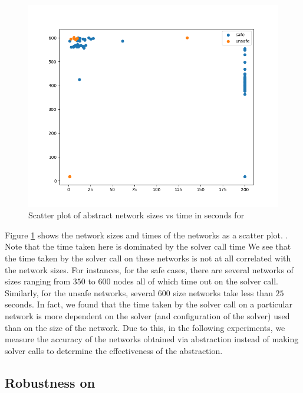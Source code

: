 \begin{figure}
    \includegraphics[scale=0.4]{figs/acas-scatter.png}
   \caption{Scatter plot of abstract network sizes vs time in seconds for
   \acasxu}
   \label{f:acas-scatter}
\end{figure}

Figure \ref{f:acas-scatter} shows the network sizes and times of the \acasxu
networks as a scatter plot. . Note that the
time taken here is dominated by the solver call time  We see that the time taken by the solver call on
these networks is not at all correlated with the network sizes. For instances,
for the safe cases, there are several networks of sizes ranging from $350$ to
$600$ \relu nodes all of which time out on the solver call. Similarly, for the
unsafe networks, several $600$ size networks take less than $25$ seconds. In
fact, we found that the time taken by the solver call on a particular network is
more dependent on the solver (and configuration of the solver) used than on the
size of the network. Due to this, in the following experiments, we measure the
accuracy of the networks obtained via abstraction instead of making solver calls
to determine the effectiveness of the abstraction. 

\subsection{Robustness on \mnist}

